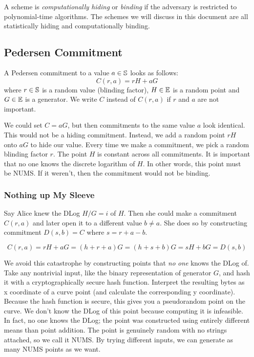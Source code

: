 A scheme is \emph{computationally hiding} or \emph{binding} if the adversary is restricted to polynomial-time algorithms.
%
The schemes we will discuss in this document are all statistically hiding and computationally binding.

\subsection{Pedersen Commitment}

A Pedersen commitment to a value $a \in \mathbb{S}$ looks as follows:
\[
    C(r, a) = rH + aG
\]
where $r \in \mathbb{S}$ is a random value (blinding factor),
$H \in \mathbb{E}$ is a random point
and $G \in \mathbb{E}$ is a generator.
We write $C$ instead of $C(r, a)$ if $r$ and $a$ are not important.

We could set $C = aG$, but then commitments to the same value $a$ look identical.
This would not be a hiding commitment.
Instead, we add a random point $rH$ onto $aG$ to hide our value.
Every time we make a commitment, we pick a random blinding factor $r$.
The point $H$ is constant across all commitments.
It is important that no one knows the discrete logarithm of $H$.
In other words, this point must be NUMS.
If it weren't, then the commitment would not be binding.

\subsubsection{Nothing up My Sleeve}

Say Alice knew the DLog $H / G = i$ of $H$.
Then she could make a commitment $C(r, a)$ and later open it to a different value $b \neq a$.
She does so by constructing commitment $D(s, b) = C$ where $s = r + a - b$.

\[
    C(r, a) = rH + aG = (h + r + a)G = (h + s + b)G = sH + bG = D(s, b)
\]

We avoid this catastrophe by constructing points that \emph{no one} knows the DLog of.
Take any nontrivial input,
like the binary representation of generator $G$,
and hash it with a cryptographically secure hash function.
Interpret the resulting bytes as x coordinate of a curve point (and calculate the corresponding y coordinate).
Because the hash function is secure, this gives you a pseudorandom point on the curve.
We don't know the DLog of this point because computing it is infeasible.
In fact, no one knows the DLog; the point was constructed using entirely different means than point addition.
The point is genuinely random with no strings attached, so we call it NUMS.
%
By trying different inputs, we can generate as many NUMS points as we want.


